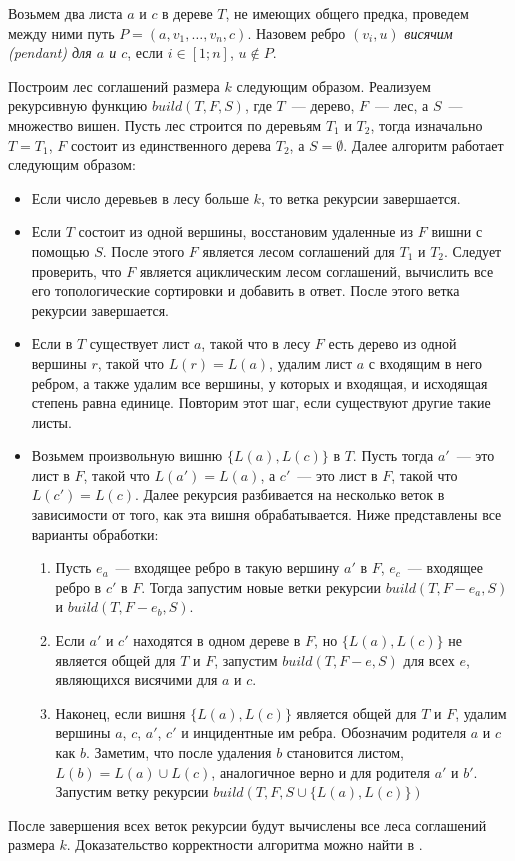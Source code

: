 \documentclass[14pt]{matmex-diploma-custom}
\begin{document}
        Возьмем два листа $a$ и $c$ в дереве $T$, не имеющих общего предка, проведем между ними путь $P=(a,v_1, \ldots, v_n, c)$. Назовем ребро $(v_i, u)$ \textit{висячим (pendant) для $a$ и $c$}, если $i \in [1;n]$, $u \notin P$.
        
        Построим лес соглашений размера $k$ следующим образом. Реализуем рекурсивную функцию $build(T, F, S)$, где $T$~--- дерево, $F$~--- лес, а $S$~--- множество вишен. Пусть лес строится по деревьям $T_1$ и $T_2$, тогда изначально $T = T_1$, $F$ состоит из единственного дерева $T_2$, а $S=\emptyset$. Далее алгоритм работает следующим образом:
        \begin{itemize}
            \item Если число деревьев в лесу больше $k$, то ветка рекурсии завершается.
            \item Если $T$ состоит из одной вершины, восстановим удаленные из $F$ вишни с помощью $S$. После этого $F$ является лесом соглашений для $T_1$ и $T_2$. Следует проверить, что $F$ является ациклическим лесом соглашений, вычислить все его топологические сортировки и добавить в ответ. После этого ветка рекурсии завершается.
            \item Если в $T$ существует лист $a$, такой что в лесу $F$ есть дерево из одной вершины $r$, такой что $L(r)=L(a)$, удалим лист $a$ с входящим в него ребром, а также удалим все вершины, у которых и входящая, и исходящая степень равна единице. Повторим этот шаг, если существуют другие такие листы.
            \item Возьмем произвольную вишню $\{L(a), L(c)\}$ в $T$. Пусть тогда $a'$~--- это лист в $F$, такой что $L(a')=L(a)$, а $c'$~--- это лист в $F$, такой что $L(c')=L(c)$. Далее рекурсия разбивается на несколько веток в зависимости от того, как эта вишня обрабатывается. Ниже представлены все варианты обработки:
            \begin{enumerate}
                \item Пусть $e_a$~--- входящее ребро в такую вершину $a'$ в $F$, $e_c$~--- входящее ребро в $c'$ в $F$. Тогда запустим новые ветки рекурсии $build(T, F - e_a, S)$ и $build(T, F - e_b, S)$.
                \item Если $a'$ и $c'$ находятся в одном дереве в $F$, но $\{L(a), L(c)\}$ не является общей для $T$ и $F$, запустим $build(T, F-e, S)$ для всех $e$, являющихся висячими для $a$ и $c$.
                \item Наконец, если вишня $\{L(a), L(c)\}$ является общей для $T$ и $F$, удалим вершины $a$, $c$, $a'$, $c'$ и инцидентные им ребра. Обозначим родителя $a$ и $c$ как $b$. Заметим, что после удаления $b$ становится листом, $L(b)=L(a)\cup L(c)$, аналогичное верно и для родителя $a'$ и $b'$. Запустим ветку рекурсии $build(T, F, S \cup \{L(a), L(c)\})$
            \end{enumerate}
        \end{itemize}
        После завершения всех веток рекурсии будут вычислены все леса соглашений размера $k$. Доказательство корректности алгоритма можно найти в \cite{ediss19444}.
    
\end{document}
